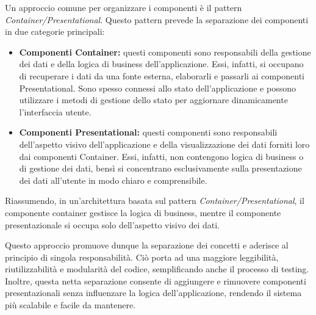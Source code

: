 Un approccio comune per organizzare i componenti è il pattern \textit{Container/Presentational}. Questo pattern prevede la separazione dei componenti in due categorie principali:
\begin{itemize}
    \item \textbf{Componenti Container:} questi componenti sono responsabili della gestione dei dati e della logica di business dell'applicazione. Essi, infatti, si occupano di recuperare i dati da una fonte esterna, elaborarli e passarli ai componenti Presentational. Sono spesso connessi allo stato dell'applicazione e possono utilizzare i metodi di gestione dello stato per aggiornare dinamicamente l'interfaccia utente.
    \item \textbf{Componenti Presentational:} questi componenti sono responsabili dell'aspetto visivo dell'applicazione e della visualizzazione dei dati forniti loro dai componenti Container. Essi, infatti, non contengono logica di business o di gestione dei dati, bensì si concentrano esclusivamente sulla presentazione dei dati all'utente in modo chiaro e comprensibile.
\end{itemize}
Riassumendo, in un'architettura basata sul pattern \textit{Container/Presentational}, il componente container gestisce la logica di business, mentre il componente presentazionale si occupa solo dell'aspetto visivo dei dati. 

Questo approccio promuove dunque la separazione dei concetti e aderisce al principio di singola responsabilità. Ciò porta ad una maggiore leggibilità, riutilizzabilità e modularità del codice, semplificando anche il processo di testing. Inoltre, questa netta separazione consente di aggiungere e rimuovere componenti presentazionali senza influenzare la logica dell'applicazione, rendendo il sistema più scalabile e facile da mantenere.

